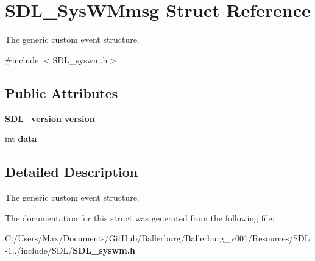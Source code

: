 \section{S\+D\+L\+\_\+\+Sys\+W\+Mmsg Struct Reference}
\label{struct_s_d_l___sys_w_mmsg}


The generic custom event structure.  




{\ttfamily \#include $<$S\+D\+L\+\_\+syswm.\+h$>$}

\subsection*{Public Attributes}
\begin{DoxyCompactItemize}
\item 
{\bf S\+D\+L\+\_\+version} {\bfseries version}\label{struct_s_d_l___sys_w_mmsg_a95f9aae58d18ee8fac556416b322a5fb}

\item 
int {\bfseries data}\label{struct_s_d_l___sys_w_mmsg_ae2399a5ef24f5a1b39ad053c71ce5a43}

\end{DoxyCompactItemize}


\subsection{Detailed Description}
The generic custom event structure. 

The documentation for this struct was generated from the following file\+:\begin{DoxyCompactItemize}
\item 
C\+:/\+Users/\+Max/\+Documents/\+Git\+Hub/\+Ballerburg/\+Ballerburg\+\_\+v001/\+Resources/\+S\+D\+L-\/1../include/\+S\+D\+L/{\bf S\+D\+L\+\_\+syswm.\+h}\end{DoxyCompactItemize}
